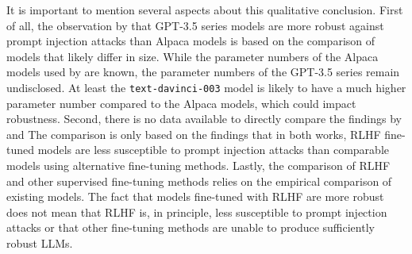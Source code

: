 It is important to mention several aspects about this qualitative conclusion.
First of all, the observation by \deng that GPT-3.5 series models are more robust against prompt injection attacks than Alpaca models is based on the comparison of models that likely differ in size.
While the parameter numbers of the Alpaca models used by \deng are known, the parameter numbers of the GPT-3.5 series remain undisclosed.
At least the \texttt{text-davinci-003} model is likely to have a much higher parameter number compared to the Alpaca models, which could impact robustness.
Second, there is no data available to directly compare the findings by \perez and \deng
The comparison is only based on the findings that in both works, RLHF fine-tuned models are less susceptible to prompt injection attacks than comparable models using alternative fine-tuning methods.
Lastly, the comparison of RLHF and other supervised fine-tuning methods relies on the empirical comparison of existing models.
The fact that models fine-tuned with RLHF are more robust does not mean that RLHF is, in principle, less susceptible to prompt injection attacks or that other fine-tuning methods are unable to produce sufficiently robust LLMs.